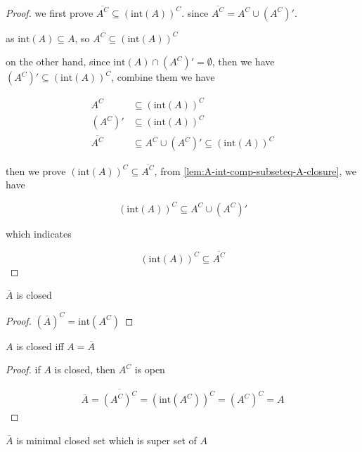 \begin{proof}
    we first prove $\overline{A^C} \subseteq \left( \mathrm{int}(A) \right)^C$. since $\overline{A^C} = A^C \cup \left(A^C\right)'$. 
    
    as $\mathrm{int}(A) \subseteq A$, so $A^C \subseteq \left(\mathrm{int}(A) \right)^C$
    
    on the other hand, since $\mathrm{int}(A) \cap (A^C)' = \emptyset$, then we have $(A^C)' \subseteq (\mathrm{int}(A))^C$, combine them 
    we have 

    \begin{align*}
        A^C &\subseteq \left(\mathrm{int}(A) \right)^C \\
        (A^C)' & \subseteq \left(\mathrm{int}(A) \right)^C \\
        \overline{A^C} &\subseteq A^C \cup (A^C)' \subseteq \left(\mathrm{int}(A) \right)^C
    \end{align*}

    then we prove $(\mathrm{int}(A))^C \subseteq \overline{A^C}$, from \autoref{lem:A-int-comp-subseteq-A-closure}, we have

    \[
        \left( \mathrm{int}(A) \right)^C \subseteq A^C \cup (A^C)'
    \]

    which indicates 


    \[
        \left( \mathrm{int}(A) \right)^C \subseteq \overline{A^C}
    \]
\end{proof}


\begin{lem}
   $\overline{A}$ is closed 
\end{lem}

\begin{proof}
    $(\overline{A})^C = \mathrm{int}(A^C)$
\end{proof}

\begin{lem}
    $A$ is closed iff $A = \overline{A}$
\end{lem}

\begin{proof}
    if $A$ is closed, then $A^C$ is open

    \begin{align*}
        \overline{A} = \overline{(A^C)^C} = (\mathrm{int}(A^C))^C = (A^C)^C = A
    \end{align*}
\end{proof}

\begin{lem}
    $\overline{A}$ is minimal closed set which is super set of $A$
\end{lem}

